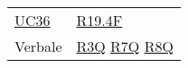 \begin{center}
\begin{longtable}[!h]{m{50px} m{50px}}
        \hyperref[sec:UC36]{UC36}         & \hyperref[tab:RequisitiFunzionali]{R19.4F}  \\

        Verbale                           & \hyperref[tab:RequisitiQualita]{R3Q}
        \newline \hyperref[tab:RequisitiQualita]{R7Q}
        \newline \hyperref[tab:RequisitiQualita]{R8Q}                                   \\
    \end{longtable}
\end{center}
